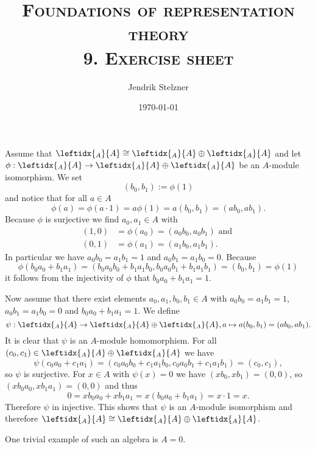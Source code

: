 \documentclass[a4paper,10pt]{article}
\title{\textsc{Foundations of representation theory \\ \Large 9. Exercise sheet}}
\author{Jendrik Stelzner}
\date{\today}
\theoremstyle{definition}
\newcommand{\li}[2]{\leftidx{_{#1}}{#2}}
\begin{document}
\maketitle





\section{}
Assume that $\li{A}{A} \cong \li{A}{A} \oplus \li{A}{A}$ and let $\phi : \li{A}{A} \rightarrow \li{A}{A} \oplus \li{A}{A}$ be an $A$-module isomorphism. We set
\[
 (b_0, b_1) := \phi(1)
\]
and notice that for all $a \in A$
\[
 \phi(a) = \phi(a \cdot 1) = a \phi(1) = a(b_0, b_1) = (ab_0, ab_1).
\]
Because $\phi$ is surjective we find $a_0, a_1 \in A$ with
\begin{align*}
 (1,0) &= \phi(a_0) = (a_0 b_0, a_0 b_1) \text{ and } \\
 (0,1) &= \phi(a_1) = (a_1 b_0, a_1 b_1).
\end{align*}
In particular we have $a_0 b_0 = a_1 b_1 = 1$ and $a_0 b_1 = a_1 b_0 = 0$. Because
\[
 \phi(b_0 a_0 + b_1 a _1)
 = (b_0 a_0 b_0 + b_1 a_1 b_0, b_0 a_0 b_1 + b_1 a_1 b_1)
 = (b_0, b_1)
 = \phi(1)
\]
it follows from the injectivity of $\phi$ that $b_0 a_0 + b_1 a_1 = 1$.

Now assume that there exist elements $a_0, a_1, b_0, b_1 \in A$ with $a_0 b_0 = a_1 b_1 = 1$, $a_0 b_1 = a_1 b_0 = 0$ and $b_0 a_0 + b_1 a_1 = 1$. We define
\[
 \psi : \li{A}{A} \rightarrow \li{A}{A} \oplus \li{A}{A}, a \mapsto a(b_0, b_1) = (ab_0, ab_1).
\]
It is clear that $\psi$ is an $A$-module homomorphism. For all $(c_0, c_1) \in \li{A}{A} \oplus \li{A}{A}$ we have
\[
 \psi(c_0 a_0 + c_1 a_1)
 = (c_0 a_0 b_0 + c_1 a_1 b_0, c_0 a_0 b_1 + c_1 a_1 b_1)
 = (c_0, c_1),
\]
so $\psi$ is surjective. For $x \in A$ with $\psi(x) = 0$ we have $(x b_0, x b_1) = (0,0)$, so $(x b_0 a_0, x b_1 a_1) = (0,0)$ and thus
\[
 0 = x b_0 a_0 + x b_1 a_1 = x (b_0 a_0 + b_1 a_1) = x \cdot 1 = x.
\]
Therefore $\psi$ in injective. This shows that $\psi$ is an $A$-module isomorphism and therefore $\li{A}{A} \cong \li{A}{A} \oplus \li{A}{A}$.

One trivial example of such an algebra is $A = 0$.
\end{document}
